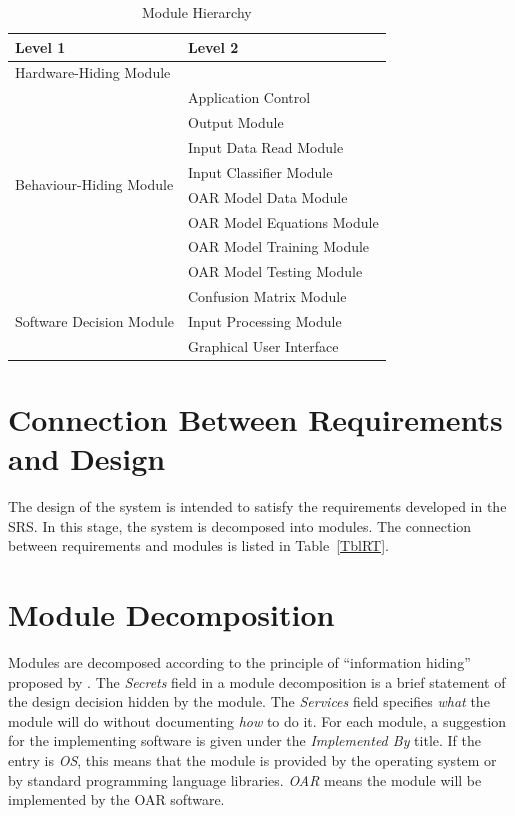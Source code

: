\documentclass[12pt, titlepage]{article}
\begin{document}
\begin{table}[h!]
\centering
\begin{tabular}{p{} p{}}
\toprule
\textbf{Level 1} & \textbf{Level 2}\\
\midrule
  
{Hardware-Hiding Module} & ~\\
\midrule
  
\multirow{8}{0.3\textwidth}{Behaviour-Hiding Module}
  & Application Control \\
  & Output Module\\
  & Input Data Read Module \\
  & Input Classifier Module\\
  & OAR Model Data Module \\
  & OAR Model Equations Module \\
  & OAR Model Training Module \\
  & OAR Model Testing Module \\
  \midrule
  
  \multirow{3}{0.3\textwidth}{Software Decision Module}
    & Confusion Matrix Module \\
    & Input Processing Module \\
    & Graphical User Interface \\
  \bottomrule
  
  \end{tabular}
\caption{Module Hierarchy}
\label{TblMH}
\end{table}

\section{Connection Between Requirements and Design} \label{SecConnection}

The design of the system is intended to satisfy the requirements developed in
the SRS. In this stage, the system is decomposed into modules. The connection
between requirements and modules is listed in Table~\ref{TblRT}.

\section{Module Decomposition} \label{SecMD}

Modules are decomposed according to the principle of ``information hiding''
proposed by \citet{ParnasEtAl1984}. The \emph{Secrets} field in a module
decomposition is a brief statement of the design decision hidden by the
module. The \emph{Services} field specifies \emph{what} the module will do
without documenting \emph{how} to do it. For each module, a suggestion for the
implementing software is given under the \emph{Implemented By} title. If the
entry is \emph{OS}, this means that the module is provided by the operating
system or by standard programming language libraries.  \emph{OAR} means the
module will be implemented by the OAR software.
\end{document}
